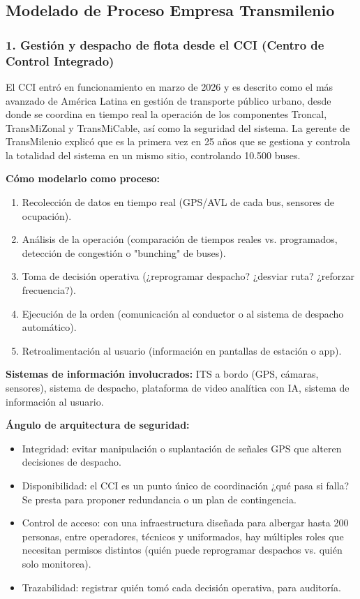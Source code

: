 \subsection{Modelado de Proceso Empresa Transmilenio}

\subsubsection*{1. Gestión y despacho de flota desde el CCI (Centro de Control Integrado)}

El CCI entró en funcionamiento en marzo de 2026 y es descrito como el más avanzado de América Latina en gestión de transporte público urbano, desde donde se coordina en tiempo real la operación de los componentes Troncal, TransMiZonal y TransMiCable, así como la seguridad del sistema. La gerente de TransMilenio explicó que es la primera vez en 25 años que se gestiona y controla la totalidad del sistema en un mismo sitio, controlando 10.500 buses.

\textbf{Cómo modelarlo como proceso:}
\begin{enumerate}
    \item Recolección de datos en tiempo real (GPS/AVL de cada bus, sensores de ocupación).
    \item Análisis de la operación (comparación de tiempos reales vs. programados, detección de congestión o "bunching" de buses).
    \item Toma de decisión operativa (¿reprogramar despacho? ¿desviar ruta? ¿reforzar frecuencia?).
    \item Ejecución de la orden (comunicación al conductor o al sistema de despacho automático).
    \item Retroalimentación al usuario (información en pantallas de estación o app).
\end{enumerate}

\textbf{Sistemas de información involucrados:} ITS a bordo (GPS, cámaras, sensores), sistema de despacho, plataforma de video analítica con IA, sistema de información al usuario.

\textbf{Ángulo de arquitectura de seguridad:}
\begin{itemize}
    \item Integridad: evitar manipulación o suplantación de señales GPS que alteren decisiones de despacho.
    \item Disponibilidad: el CCI es un punto único de coordinación ¿qué pasa si falla? Se presta para proponer redundancia o un plan de contingencia.
    \item Control de acceso: con una infraestructura diseñada para albergar hasta 200 personas, entre operadores, técnicos y uniformados, hay múltiples roles que necesitan permisos distintos (quién puede reprogramar despachos vs. quién solo monitorea).
    \item Trazabilidad: registrar quién tomó cada decisión operativa, para auditoría.
\end{itemize}

